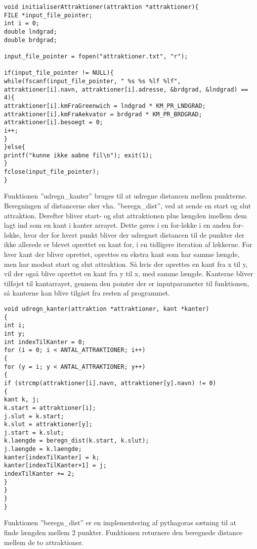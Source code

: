 \begin{lstlisting}
void initialiserAttraktioner(attraktion *attraktioner){
FILE *input_file_pointer;
int i = 0;
double lndgrad;
double brdgrad;

input_file_pointer = fopen("attraktioner.txt", "r");

if(input_file_pointer != NULL){
while(fscanf(input_file_pointer, " %s %s %lf %lf", attraktioner[i].navn, attraktioner[i].adresse, &brdgrad, &lndgrad) == 4){
attraktioner[i].kmFraGreenwich = lndgrad * KM_PR_LNDGRAD;
attraktioner[i].kmFraAekvator = brdgrad * KM_PR_BRDGRAD;
attraktioner[i].besoegt = 0;
i++;
}
}else{
printf("kunne ikke aabne fil\n"); exit(1);
}
fclose(input_file_pointer);
} 
\end{lstlisting}

Funktionen ”udregn\_kanter” bruges til at udregne distancen mellem punkterne. Beregningen af distancerne sker vha. ”beregn\_dist”, ved at sende en start og slut attraktion. Derefter bliver start- og slut attraktionen plus længden imellem dem lagt ind som en kant i kanter arrayet. Dette gøres i en for-løkke i en anden for-løkke, hvor der for hvert punkt bliver der udregnet distancen til de punkter der ikke allerede er blevet oprettet en kant for, i en tidligere iteration af løkkerne. For hver kant der bliver oprettet, oprettes en ekstra kant som har samme længde, men har modsat start og slut attraktion. Så hvis der oprettes en kant fra x til y, vil der også blive oprettet en kant fra y til x, med samme længde. Kanterne bliver tilføjet til kantarrayet, gennem den pointer der er inputparameter til funktionen, så kanterne kan blive tilgået fra resten af programmet. \newline

\begin{lstlisting}
void udregn_kanter(attraktion *attraktioner, kant *kanter)
{
int i;
int y;
int indexTilKanter = 0;
for (i = 0; i < ANTAL_ATTRAKTIONER; i++)
{
for (y = i; y < ANTAL_ATTRAKTIONER; y++)
{
if (strcmp(attraktioner[i].navn, attraktioner[y].navn) != 0)
{
kant k, j;
k.start = attraktioner[i];
j.slut = k.start;
k.slut = attraktioner[y];
j.start = k.slut;
k.laengde = beregn_dist(k.start, k.slut);
j.laengde = k.laengde;
kanter[indexTilKanter] = k;
kanter[indexTilKanter+1] = j;
indexTilKanter += 2;
}
}
}
}
\end{lstlisting}

Funktionen ”beregn\_dist” er en implementering af pythagoras sætning til at finde længden mellem 2 punkter. Funktionen returnere den beregnede distance mellem de to attraktioner. \newline

